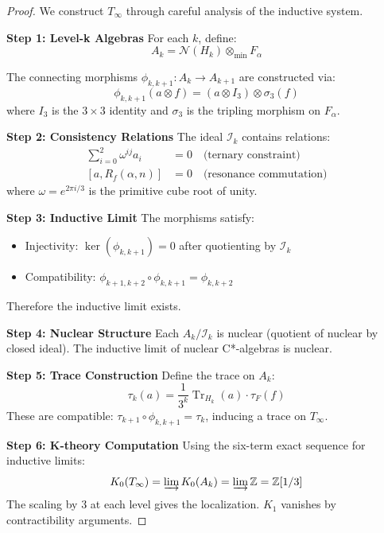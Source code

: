 \documentclass[11pt]{article}
\theoremstyle{definition}
\DeclareMathOperator{\Tr}{Tr}
\begin{document}
\begin{proof}
We construct $T_\infty$ through careful analysis of the inductive system.

\textbf{Step 1: Level-k Algebras}
For each $k$, define:
\begin{equation}
A_k = \mathcal{N}(H_k) \otimes_{\text{min}} F_\alpha
\end{equation}

The connecting morphisms $\phi_{k,k+1} : A_k \to A_{k+1}$ are constructed via:
\begin{equation}
\phi_{k,k+1}(a \otimes f) = (a \otimes I_3) \otimes \sigma_3(f)
\end{equation}
where $I_3$ is the $3 \times 3$ identity and $\sigma_3$ is the tripling morphism on $F_\alpha$.

\textbf{Step 2: Consistency Relations}
The ideal $\mathcal{I}_k$ contains relations:
\begin{align}
\sum_{i=0}^{2} \omega^{ij} a_i &= 0 \quad \text{(ternary constraint)}\\
[a, R_f(\alpha, n)] &= 0 \quad \text{(resonance commutation)}
\end{align}
where $\omega = e^{2\pi i/3}$ is the primitive cube root of unity.

\textbf{Step 3: Inductive Limit}
The morphisms satisfy:
\begin{itemize}
\item Injectivity: $\ker(\phi_{k,k+1}) = 0$ after quotienting by $\mathcal{I}_k$
\item Compatibility: $\phi_{k+1,k+2} \circ \phi_{k,k+1} = \phi_{k,k+2}$
\end{itemize}

Therefore the inductive limit exists.

\textbf{Step 4: Nuclear Structure}
Each $A_k/\mathcal{I}_k$ is nuclear (quotient of nuclear by closed ideal). The inductive limit of nuclear C*-algebras is nuclear.

\textbf{Step 5: Trace Construction}
Define the trace on $A_k$:
\begin{equation}
\tau_k(a) = \frac{1}{3^k} \Tr_{H_k}(a) \cdot \tau_F(f)
\end{equation}
These are compatible: $\tau_{k+1} \circ \phi_{k,k+1} = \tau_k$, inducing a trace on $T_\infty$.

\textbf{Step 6: K-theory Computation}
Using the six-term exact sequence for inductive limits:
\begin{equation}
K_0(T_\infty) = \varinjlim K_0(A_k) = \varinjlim \mathbb{Z} = \mathbb{Z}[1/3]
\end{equation}
The scaling by 3 at each level gives the localization. $K_1$ vanishes by contractibility arguments.
\end{proof}
\end{document}
